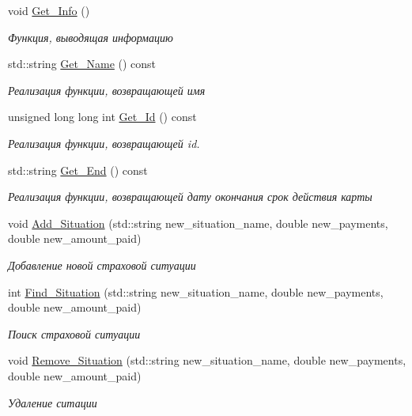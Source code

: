 \begin{DoxyCompactItemize}
\item 
void \hyperlink{classCInsurancePolicyDecorator_a384623ef8968d9fb0c969d38df389a5c}{Get\+\_\+\+Info} ()
\begin{DoxyCompactList}\small\item\em Функция, выводящая информацию \end{DoxyCompactList}\item 
std\+::string \hyperlink{classCInsurancePolicyDecorator_aee255120cc97e0343a7c4ef4a32a24cd}{Get\+\_\+\+Name} () const 
\begin{DoxyCompactList}\small\item\em Реализация функции, возвращающей имя \end{DoxyCompactList}\item 
unsigned long long int \hyperlink{classCInsurancePolicyDecorator_adbf5a35779814478d2566e359e195920}{Get\+\_\+\+Id} () const 
\begin{DoxyCompactList}\small\item\em Реализация функции, возвращающей id. \end{DoxyCompactList}\item 
std\+::string \hyperlink{classCInsurancePolicyDecorator_a797cbfc7822cc8fa7d9ccad23340ddd4}{Get\+\_\+\+End} () const 
\begin{DoxyCompactList}\small\item\em Реализация функции, возвращающей дату окончания срок действия карты \end{DoxyCompactList}\item 
void \hyperlink{classCInsurancePolicyDecorator_aa1c549f45d71080274017448fa76f71b}{Add\+\_\+\+Situation} (std\+::string new\+\_\+situation\+\_\+name, double new\+\_\+payments, double new\+\_\+amount\+\_\+paid)
\begin{DoxyCompactList}\small\item\em Добавление новой страховой ситуации \end{DoxyCompactList}\item 
int \hyperlink{classCInsurancePolicyDecorator_ad51167a636d8bf02b571b1e6f9d731ae}{Find\+\_\+\+Situation} (std\+::string new\+\_\+situation\+\_\+name, double new\+\_\+payments, double new\+\_\+amount\+\_\+paid)
\begin{DoxyCompactList}\small\item\em Поиск страховой ситуации \end{DoxyCompactList}\item 
void \hyperlink{classCInsurancePolicyDecorator_a1f2c4a9d1ef45b97e2fb5d0af2422d20}{Remove\+\_\+\+Situation} (std\+::string new\+\_\+situation\+\_\+name, double new\+\_\+payments, double new\+\_\+amount\+\_\+paid)
\begin{DoxyCompactList}\small\item\em Удаление ситации \end{DoxyCompactList}\end{DoxyCompactItemize}


